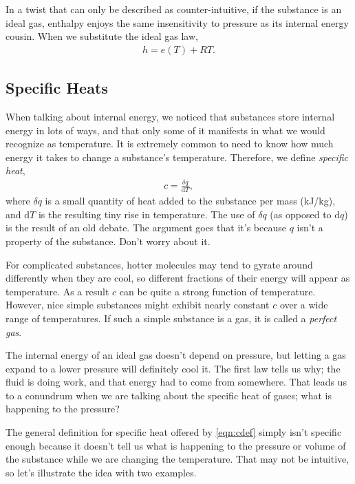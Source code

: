 In a twist that can only be described as counter-intuitive, if the substance is an ideal gas, enthalpy enjoys the same insensitivity to pressure as its internal energy cousin.  When we substitute the ideal gas law,
\begin{align}
h = e(T) + RT.
\end{align}

\subsection{Specific Heats}
When talking about internal energy, we noticed that substances store internal energy in lots of ways, and that only some of it manifests in what we would recognize as temperature.  It is extremely common to need to know how much energy it takes to change a substance's temperature.  Therefore, we define \emph{specific heat},
\begin{align}
c = \frac{\delta q}{\mathrm{d} T},\label{eqn:cdef}
\end{align}
where $\delta q$ is a small quantity of heat added to the substance per mass (kJ/kg), and $\mathrm{d} T$ is the resulting tiny rise in temperature.  The use of $\delta q$ (as opposed to $\mathrm{d} q$) is the result of an old debate.  The argument goes that it's because $q$ isn't a property of the substance.  Don't worry about it.

For complicated substances, hotter molecules may tend to gyrate around differently when they are cool, so different fractions of their energy will appear as temperature.  As a result $c$ can be quite a strong function of temperature.  However, nice simple substances might exhibit nearly constant $c$ over a wide range of temperatures.  If such a simple substance is a gas, it is called a \emph{perfect gas}.

The internal energy of an ideal gas doesn't depend on pressure, but letting a gas expand to a lower pressure will definitely cool it.  The first law tells us why; the fluid is doing work, and that energy had to come from somewhere.  That leads us to a conundrum when we are talking about the specific heat of gases; what is happening to the pressure?

The general definition for specific heat offered by \ref{eqn:cdef} simply isn't specific enough because it doesn't tell us what is happening to the pressure or volume of the substance while we are changing the temperature.  That may not be intuitive, so let's illustrate the idea with two examples.

